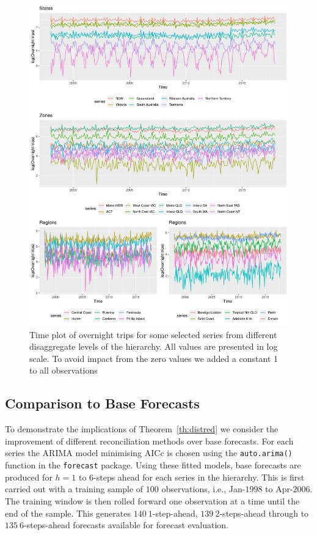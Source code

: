 \documentclass[12pt]{article}
\theoremstyle{definition}
\theoremstyle{property}
\begin{document}
\begin{figure}
		\centering
		\small
		\includegraphics[width= \textwidth]{Empirical-results/TS-plots/States_Zones_Regs_TSplots1.pdf}
		\caption{Time plot of overnight trips for some selected series from different disaggregate levels of the hierarchy. All values are presented in log scale. To avoid impact from the zero values we added a constant 1 to all observations}\label{fig:States_Zones_Regs_TSplots}
\end{figure}

\clearpage

    \subsection{Comparison to Base Forecasts}\label{sec:comparebase}
    
    To demonstrate the implications of Theorem~\ref{th:distred} we consider the improvement of different reconciliation methods over base forecasts.  For each series the ARIMA model minimising AICc is chosen using the \verb|auto.arima()| function in the \verb|forecast| package.  Using these fitted models, base forecasts are produced for $h=1$ to $6$-steps ahead for each series in the hierarchy.  This is first carried out with a training sample of $100$ observations, i.e., Jan-$1998$ to Apr-$2006$. The training window is then rolled forward one observation at a time until the end of the sample. This generates $140~1$-step-ahead, $139~2$-steps-ahead through to $135~6$-steps-ahead forecasts available for forecast evaluation.
    
\end{document}
